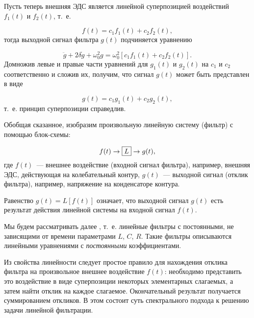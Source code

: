 Пусть теперь внешняя ЭДС является линейной суперпозицией воздействий $f_1(t)$ и $f_2(t)$, т.~е.

\begin{equation*}
	f(t)=c_1f_1(t)+c_2f_2(t),
\end{equation*}
тогда выходной сигнал фильтра $g(t)$ подчиняется уравнению

\begin{equation*}
	\ddot{g}+2\delta\dot{g}+\omega_0^2g=\omega_0^2[c_1f_1(t)+c_2f_2(t)].
\end{equation*}
Домножив левые и правые части уравнений для $g_1(t)$ и $g_2(t)$ на $c_1$ и $c_2$ соответственно и сложив их, получим,
что сигнал $g(t)$ может быть представлен в виде

\begin{equation*}
	g(t)=c_1g_1(t)+c_2g_2(t),
\end{equation*}
т.~е. принцип суперпозиции справедлив.

Обобщая сказанное, изобразим произвольную линейную систему (фильтр) с помощью блок-схемы:

\begin{equation*}
	f(t)\to\fbox{$L$} \to g(t),
\end{equation*}
где $f(t)$~--- внешнее воздействие (входной сигнал фильтра), например, внешняя ЭДС, действующая на колебательный контур,
$g(t)$~--- выходной сигнал (отклик фильтра), например, напряжение на конденсаторе контура.

Равенство $g(t)=L[f(t)]$ означает, что выходной сигнал $g(t)$ есть результат действия линейной системы на входной сигнал $f(t)$. 


Мы будем рассматривать далее , т.~е. линейные фильтры с постоянными, не зависящими от
времени параметрами $L$, $C$, $R$. Такие фильтры описываются линейными уравнениями с \emph{постоянными} коэффициентами.

Из свойства линейности следует простое правило для нахождения отклика фильтра на произвольное внешнее воздействие $f(t)$:
необходимо представить это воздействие в виде суперпозиции некоторых элементарных слагаемых, а затем найти отклик на
каждое слагаемое. Окончательный результат получается суммированием откликов. В этом состоит суть спектрального подхода к
решению задачи линейной фильтрации.


